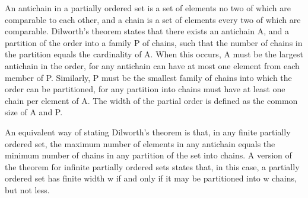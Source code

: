 An antichain in a partially ordered set is a set 
of elements no two of which are comparable to each 
other, and a chain is a set of elements every two 
of which are comparable. Dilworth's theorem states 
that there exists an antichain A, and a partition 
of the order into a family P of chains, such that 
the number of chains in the partition equals the 
cardinality of A. When this occurs, A must be the 
largest antichain in the order, for any antichain 
can have at most one element from each member of 
P. Similarly, P must be the smallest family of 
chains into which the order can be partitioned, 
for any partition into chains must have at least 
one chain per element of A. The width of the 
partial order is defined as the common size of A and P.

An equivalent way of stating Dilworth's theorem is that, 
in any finite partially ordered set, the maximum number 
of elements in any antichain equals the minimum number 
of chains in any partition of the set into chains. A 
version of the theorem for infinite partially ordered 
sets states that, in this case, a partially ordered 
set has finite width w if and only if it may be 
partitioned into w chains, but not less.